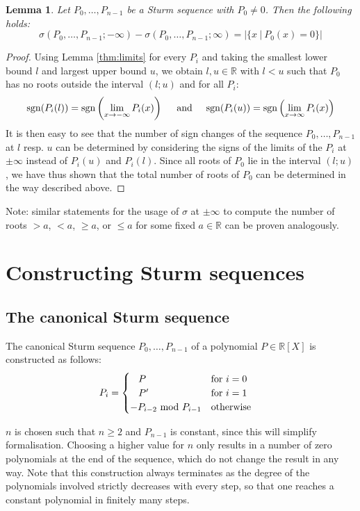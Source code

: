 \documentclass[11pt,a4paper,oneside]{article}
\newtheorem{lemma}[definition]{Lemma}
\newcommand{\RR}{\mathbb{R}}
\newcommand{\sgn}{\mathrm{sgn}}
\begin{document}
\begin{lemma}\label{thm:count_roots}
Let $P_0,\ldots,P_{n-1}$ be a Sturm sequence with $P_0\neq 0$. Then the following holds: $$\sigma(P_0,\ldots,P_{n-1}; -\infty)-\sigma(P_0,\ldots,P_{n-1}; \infty) = |\{x\ |\ P_0(x)=0\}|$$
\end{lemma}
\begin{proof}
Using Lemma \ref{thm:limits} for every $P_i$ and taking the smallest lower bound $l$ and largest upper bound $u$, we obtain $l,u\in\RR$ with $l<u$ such that $P_0$ has no roots outside the interval $(l;u)$ and for all $P_i$: $$\sgn(P_i(l))=\sgn\left(\lim_{x\to -\infty} P_i(x)\right)\hskip5mm\mathrm{and}\hskip5mm\sgn(P_i(u))=\sgn\left(\lim_{x\to \infty} P_i(x)\right)$$ It is then easy to see that the number of sign changes of the sequence $P_0,\ldots,P_{n-1}$ at $l$ resp. $u$ can be determined by considering the signs of the limits of the $P_i$ at $\pm\infty$ instead of $P_i(u)$ and $P_i(l)$. Since all roots of $P_0$ lie in the interval $(l;u)$, we have thus shown that the total number of roots of $P_0$ can be determined in the way described above.
\end{proof}

Note: similar statements for the usage of $\sigma$ at $\pm\infty$ to compute the number of roots $>a$, $<a$, $\geq a$, or $\leq a$ for some fixed $a\in\RR$ can be proven analogously.

\newpage
\section{Constructing Sturm sequences}
\label{sec:construction}
\subsection{The canonical Sturm sequence}

The canonical Sturm sequence $P_0,\ldots,P_{n-1}$ of a polynomial $P\in\RR[X]$ is constructed as follows:
\begin{align*}
P_i = \begin{cases}
\hskip3mm P & \mathrm{for}\ i = 0\\
\hskip3mm P' & \mathrm{for}\ i = 1\\
-P_{i-2}\ \mathrm{mod}\ P_{i-1} &\mathrm{otherwise}
\end{cases}&
\end{align*}

$n$ is chosen such that $n\geq 2$ and $P_{n-1}$ is constant, since this will simplify formalisation. Choosing a higher value for $n$ only results in a number of zero polynomials at the end of the sequence, which do not change the result in any way. Note that this construction always terminates as the degree of the polynomials involved strictly decreases with every step, so that one reaches a constant polynomial in finitely many steps.\\
\end{document}
